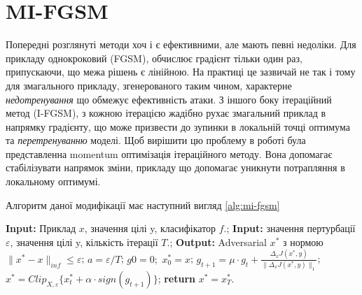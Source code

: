 \documentclass[a4paper,14pt]{extreport}
\renewcommand{\algorithmicrequire}{\textbf{Input: }}
\renewcommand{\algorithmicensure}{\textbf{Output: }}
\newcommand{\algorithmreturn}{\textbf{return }}
\begin{document}

	\section{MI-FGSM}	
	Попередні розглянуті методи хоч і є ефективними, але мають певні недоліки.
	Для прикладу однокроковий (FGSM), обчислює градієнт тільки один раз, припускаючи, що межа рішень є лінійною. На практиці це зазвичай не так і тому для змагального прикладу, згенерованого таким чином, характерне \textit{недотренування} що обмежує ефективність атаки. З іншого боку ітераційний метод (I-FGSM), з кожною ітерацією жадібно рухає змагальний приклад в напрямку градієнту, що може призвести до зупинки в локальній точці оптимума та \textit{перетренуванню} моделі. Щоб вирішити цю проблему в роботі \textcite{dong2017boosting} була представленна momentum оптимізація ітераційного методу. Вона допомагає стабілізувати напрямок зміни, прикладу що допомагає уникнути потрапляння в локальному оптимумі.
	
	Алгоритм даної модифікації має наступний вигляд \ref{alg:mi-fgsm}	
	\begin{algorithm}
		\caption{$MI-FGSM$}
		\label{alg:mi-fgsm}
		\begin{algorithmic}[1]
			\State \algorithmicrequire{Приклад $x$, значення цілі y, класифікатор $f$.};
			\State \algorithmicrequire{значення пертурбації $\varepsilon$, значення цілі y, кількість ітерації $T$.};
			\State \algorithmicensure{ Adversarial $x^{*}$ з нормою $\|x^{*} - x\|_{inf} \leq \varepsilon $};
			\State $a = \varepsilon / T$;
			\State $g0 = 0;$ $x^{*}_0 = x$;
			\State $g_{t+1} = \mu \cdot g_t + \frac{\Delta_x J(x^{*}, y)}{\|\Delta_x J(x^{*}, y)\|_1}$;
			\State $x^{*} = Clip_{X, \varepsilon} \big\{ x^{*}_{t} + \alpha \cdot sign(g_{t+1}) \big\}$;
			\EndFor
			\State \algorithmreturn{$x^{*} = x^{*}_{T}$}.
		\end{algorithmic}
	\end{algorithm}
	
\end{document}
